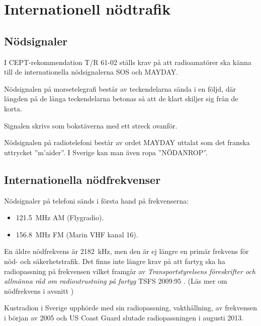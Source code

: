 \section{Internationell nödtrafik}

\subsection{Nödsignaler}
\label{nödsignaler}

I CEPT-rekommendation T/R 61-02 \cite{TR6102} ställs krav på att radioamatörer
ska känna till de internationella nödsignalerna SOS och MAYDAY.

Nödsignalen på morsetelegrafi består av teckendelarna \Mcharsep\MSOS %
sända i en följd, där längden på de långa teckendelarna betonas så att de klart
skiljer sig från de korta.

Signalen skrivs som bokstäverna  med ett streck ovanför.

Nödsignalen på radiotelefoni består av ordet MAYDAY uttalat som det franska
uttrycket ''m'aider''. I Sverige kan man även ropa ''NÖDANROP''.

\subsection{Internationella nödfrekvenser}
\label{nödfrekvens}

Nödsignaler på telefoni sänds i första hand på frekvenserna:

\begin{itemize}
  \item \qty{121,5}{\mega\hertz} AM (Flygradio).
  \item \qty{156,8}{\mega\hertz} FM (Marin VHF kanal 16).
\end{itemize}

En äldre nödfrekvens är \qty{2182}{\kilo\hertz}, men den är ej längre en primär
frekvens för nöd- och säkerhetstrafik.
Det finns inte längre krav på att fartyg ska ha radiopassning på frekvensen
vilket framgår av \emph{Transportstyrelsens föreskrifter och allmänna råd
	om radioutrustning på fartyg} TSFS 2009:95 \cite[\S22]{TSFS2009:95}.
(Läs mer om nödfrekvens i avsnitt )

Kustradion i Sverige upphörde med sin radiopassning, vakthållning, av frekvensen
i början av 2005 och US Coast Guard slutade radiopassningen i augusti 2013.

